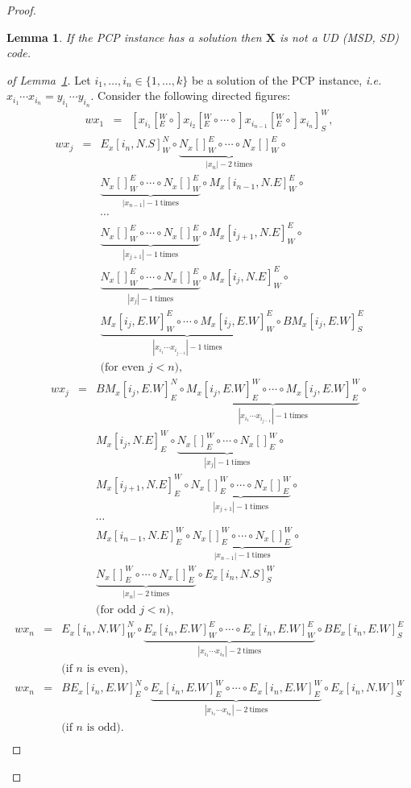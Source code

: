 \documentclass[final,nomarks]{dmtcs-episciences}
\newcommand{\NN}[1]{\{1,\ldots,#1\}}
\newcommand{\circTimes}[2]{\underbrace{#1\circ\cdots\circ #1}_{#2\mathrm{~times}}}
\newtheorem{lemma}{Lemma}
\begin{document}
\begin{proof}
\begin{lemma}\label{post-code}
If the PCP instance has a solution then $\mathbf{X}$ is not a UD (MSD, SD) code.
\end{lemma}

\begin{proof}[of Lemma~\ref{post-code}]
Let $i_1,\ldots,i_n\in\NN{k}$ be a solution of the PCP instance, \textit{i.e.}\
$x_{i_1}\cdots x_{i_n}=y_{i_1}\cdots y_{i_n}$.
Consider the following directed figures:
\begin{eqnarray*}
 wx_1&=&[x_{i_1}[^W_E\circ]x_{i_2}[^W_E\circ\cdots\circ]x_{i_{n-1}}[^W_E\circ]x_{i_n}]^W_S,
\end{eqnarray*}
\begin{eqnarray*}
 wx_j&=&E_x[i_n,N.S]^N_W\circ\circTimes{N_x[]^E_W}{|x_n|-2}\circ\\
 	&&\circTimes{N_x[]^E_W}{|x_{n-1}|-1}\circ M_x[i_{n-1},N.E]^E_W\circ\\
 	&&\cdots\\
	&&\circTimes{N_x[]^E_W}{|x_{j+1}|-1}\circ M_x[i_{j+1},N.E]^E_W\circ\\
	&&\circTimes{N_x[]^E_W}{|x_j|-1}\circ M_x[i_j,N.E]^E_W\circ\\
	&&\circTimes{M_x[i_j,E.W]^E_W}{|x_{i_1}\cdots x_{i_{j-1}}|-1}\circ
BM_x[i_j,E.W]^E_S\\
	&&\mbox{(for even $j<n$)},
\end{eqnarray*}
\begin{eqnarray*}
 wx_j&=&BM_x[i_j,E.W]^N_E\circ\circTimes{M_x[i_j,E.W]^W_E}{|x_{i_1}\cdots
x_{i_{j-1}}|-1}\circ\\
 	&&M_x[i_j,N.E]^W_E\circ\circTimes{N_x[]^W_E}{|x_j|-1}\circ\\
 	&&M_x[i_{j+1},N.E]^W_E\circ\circTimes{N_x[]^W_E}{|x_{j+1}|-1}\circ\\
 	&&\cdots\\
 	&&M_x[i_{n-1},N.E]^W_E\circ\circTimes{N_x[]^W_E}{|x_{n-1}|-1}\circ\\
 	&&\circTimes{N_x[]^W_E}{|x_n|-2}\circ E_x[i_n,N.S]^W_S\\
 	&&\mbox{(for odd $j<n$)},
\end{eqnarray*}
\begin{eqnarray*}
 wx_n&=&E_x[i_n,N.W]^N_W\circ\circTimes{E_x[i_n,E.W]^E_W}{|x_{i_1}\cdots
x_{i_n}|-2}\circ BE_x[i_n,E.W]^E_S\\
 &&\mbox{(if $n$ is even)},\\
 wx_n&=&BE_x[i_n,E.W]^N_E\circ\circTimes{E_x[i_n,E.W]^W_E}{|x_{i_1}\cdots
x_{i_n}|-2}\circ E_x[i_n,N.W]^W_S\\
 &&\mbox{(if $n$ is odd)}.
\end{eqnarray*}
\begin{eqnarray*}
\end{eqnarray*}


\end{proof}
\end{proof}
\end{document}
